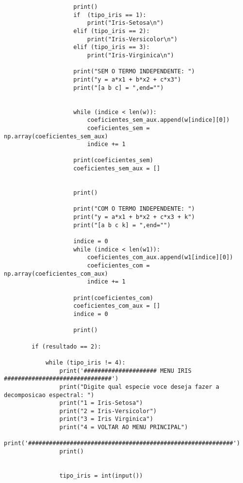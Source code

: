 \documentclass[a4paper,12pt,twoside]{article}
\begin{document}
\begin{lstlisting}
                    print()
                    if  (tipo_iris == 1):
                        print("Iris-Setosa\n")
                    elif (tipo_iris == 2):
                        print("Iris-Versicolor\n")
                    elif (tipo_iris == 3):
                        print("Iris-Virginica\n")
                        
                    print("SEM O TERMO INDEPENDENTE: ")
                    print("y = a*x1 + b*x2 + c*x3")
                    print("[a b c] = ",end="")
                    
                    
                    while (indice < len(w)):
                        coeficientes_sem_aux.append(w[indice][0])
                        coeficientes_sem = np.array(coeficientes_sem_aux)
                        indice += 1
                    
                    print(coeficientes_sem)
                    coeficientes_sem_aux = []
                    
                        
                    print()
                    
                    print("COM O TERMO INDEPENDENTE: ")
                    print("y = a*x1 + b*x2 + c*x3 + k")
                    print("[a b c k] = ",end="")
                    
                    indice = 0
                    while (indice < len(w1)):
                        coeficientes_com_aux.append(w1[indice][0])
                        coeficientes_com = np.array(coeficientes_com_aux)
                        indice += 1
                    
                    print(coeficientes_com)
                    coeficientes_com_aux = []  
                    indice = 0
                   
                    print()
    
        if (resultado == 2):
            
            while (tipo_iris != 4):
                print('##################### MENU IRIS ###############################')
                print("Digite qual especie voce deseja fazer a decomposicao espectral: ")
                print("1 = Iris-Setosa")
                print("2 = Iris-Versicolor")
                print("3 = Iris Virginica")
                print("4 = VOLTAR AO MENU PRINCIPAL")
                print('###########################################################')
                print()
             
             
                tipo_iris = int(input())
                

\end{lstlisting}
\end{document}
